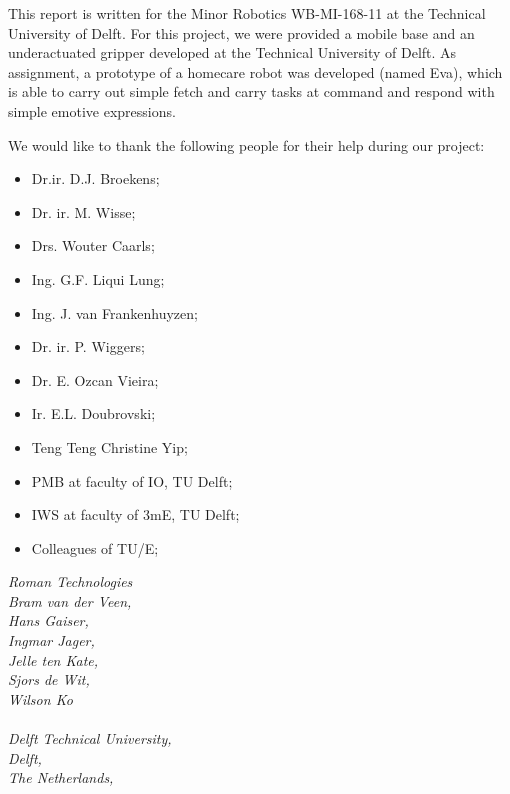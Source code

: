 \documentclass[technical_document.tex]{subfiles}
\begin{document}
This report is written for the Minor Robotics WB-MI-168-11 at the Technical University of Delft. For this project, we were provided a mobile base and an underactuated gripper developed at the Technical University of Delft. As assignment, a prototype of a homecare robot was developed (named Eva), which is able to carry out simple fetch and carry tasks at command and respond with simple emotive expressions.

We would like to thank the following people for their help during our project:
\begin{itemize}
\item[] Dr.ir. D.J. Broekens;
\item[] Dr. ir. M. Wisse;
\item[] Drs. Wouter Caarls;
\item[] Ing. G.F. Liqui Lung; 
\item[] Ing. J. van Frankenhuyzen; 
\item[] Dr. ir. P. Wiggers; 
\item[] Dr. E. Ozcan Vieira;
\item[] Ir. E.L. Doubrovski; 
\item[] Teng Teng Christine Yip;
\item[] PMB at faculty of IO, TU Delft;
\item[] IWS at faculty of 3mE, TU Delft;
\item[] Colleagues of TU/E;
\end{itemize}
 

\textit{
Roman Technologies\\
Bram van der Veen,\\
Hans Gaiser,\\
Ingmar Jager,\\
Jelle ten Kate,\\  
Sjors de Wit,\\
Wilson Ko\\\\
Delft Technical University,\\
Delft,\\
The Netherlands,\\
}
\end{document}
